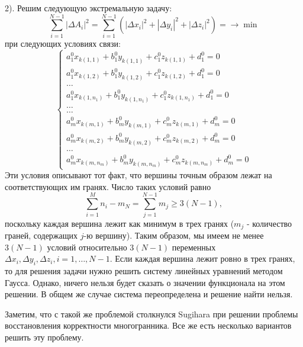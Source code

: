 \documentclass[a4paper,12pt, titlepage]{article}
\begin{document}
	\begin{flushleft}
		2). Решим следующую экстремальную задачу:
		$$
		  \sum\limits_{i = 1}^{N - 1}|\Delta A_{i}|^{2} = \sum\limits_{i = 1}^{N - 1}(|\Delta x_{i}|^{2} + |\Delta y_{i}|^{2} + |\Delta z_{i}|^{2}) = \to \min
		$$
		при следующих условиях связи:
		$$
			\left\{
				\begin{aligned}
					a^{0}_{1} x_{k(1, 1)} + b^{0}_{1} y_{k(1, 1)} + c^{0}_{1} z_{k(1, 1)} + d^{0}_{1} = 0 \\
					a^{0}_{1} x_{k(1, 2)} + b^{0}_{1} y_{k(1, 2)} + c^{0}_{1} z_{k(1, 2)} + d^{0}_{1} = 0 \\
					\ldots \\
					a^{0}_{1} x_{k(1, n_{1})} + b^{0}_{1} y_{k(1, n_{1})} + c^{0}_{1} z_{k(1, n_{1})} + d^{0}_{1} = 0 \\
					\ldots \\
					\ldots \\
					a^{0}_{m} x_{k(m, 1)} + b^{0}_{m} y_{k(m, 1)} + c^{0}_{m} z_{k(m, 1)} + d^{0}_{m} = 0 \\
					a^{0}_{m} x_{k(m, 2)} + b^{0}_{m} y_{k(m, 2)} + c^{0}_{m} z_{k(m, 2)} + d^{0}_{m} = 0 \\
					\ldots \\
					a^{0}_{m} x_{k(m, n_{m})} + b^{0}_{m} y_{k(m, n_{m})} + c^{0}_{m} z_{k(m, n_{m})} + d^{0}_{m} = 0
				\end{aligned}
			\right.
		$$
		Эти условия описывают тот факт, что вершины точным образом лежат на соответствующих им гранях.
		Число таких условий равно 
		$$
			\sum\limits_{i = 1}^{M}n_{i} - m_{N} = \sum\limits_{j = 1}^{N - 1}m_{j} \ge 3 (N - 1),
		$$
		поскольку каждая вершина лежит как минимум в трех гранях ($m_{j}$ - количество граней, содержащих $j$-ю
		вершину). Таким образом, мы имеем не менее $3 (N - 1)$ 
		условий относительно $3 (N - 1)$ переменных 
		$\Delta x_{i}, \Delta y_{i}, \Delta z_{i}, i = 1, \ldots, N - 1$. Если каждая вершина лежит ровно в трех 
		гранях, то для решения задачи нужно решить систему линейных уравнений методом Гаусса. Однако, ничего нельзя
		будет сказать о значении функционала на этом решении. В общем же случае система переопределена и решение
		найти нельзя.
	\end{flushleft}
	\begin{flushleft}
		Заметим, что с такой же проблемой столкнулся Sugihara при решении проблемы восстановления корректности
		многогранника. Все же есть несколько вариантов решить эту проблему.
	\end{flushleft}
\end{document}

